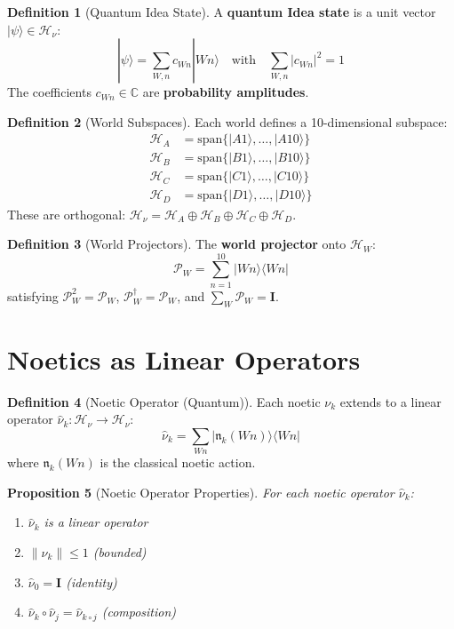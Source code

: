 \documentclass[11pt,twoside,openright]{book}
\theoremstyle{definition}
\newtheorem{definition}{Definition}[chapter]
\theoremstyle{plain}
\newtheorem{proposition}[definition]{Proposition}
\theoremstyle{remark}
\newcommand{\noe}[1]{\nu_{#1}}
\newcommand{\Hspace}{\mathcal{H}}
\newcommand{\qket}[1]{|#1\rangle}
\newcommand{\qbra}[1]{\langle #1|}
\newcommand{\qop}[1]{\hat{#1}}
\newcommand{\Projector}{\mathcal{P}}         %
\begin{document}
\begin{definition}[Quantum Idea State]
\label{def:quantum-idea}
A \textbf{quantum Idea state} is a unit vector $\qket{\psi} \in \Hspace_\nu$:
\[
\qket{\psi} = \sum_{W,n} c_{Wn} \qket{Wn} \quad \text{with} \quad \sum_{W,n} |c_{Wn}|^2 = 1
\]
The coefficients $c_{Wn} \in \mathbb{C}$ are \textbf{probability amplitudes}.
\end{definition}

\begin{definition}[World Subspaces]
\label{def:world-subspaces}
Each world defines a 10-dimensional subspace:
\begin{align}
\Hspace_A &= \mathrm{span}\{\qket{A1}, \ldots, \qket{A10}\} \\
\Hspace_B &= \mathrm{span}\{\qket{B1}, \ldots, \qket{B10}\} \\
\Hspace_C &= \mathrm{span}\{\qket{C1}, \ldots, \qket{C10}\} \\
\Hspace_D &= \mathrm{span}\{\qket{D1}, \ldots, \qket{D10}\}
\end{align}
These are orthogonal: $\Hspace_\nu = \Hspace_A \oplus \Hspace_B \oplus \Hspace_C \oplus \Hspace_D$.
\end{definition}

\begin{definition}[World Projectors]
\label{def:world-projectors}
The \textbf{world projector} onto $\Hspace_W$:
\[
\Projector_W = \sum_{n=1}^{10} \qket{Wn}\qbra{Wn}
\]
satisfying $\Projector_W^2 = \Projector_W$, $\Projector_W^\dagger = \Projector_W$, and $\sum_W \Projector_W = \mathbf{I}$.
\end{definition}

\section{Noetics as Linear Operators}

\begin{definition}[Noetic Operator (Quantum)]
\label{def:noetic-operator-quantum}
Each noetic $\noe{k}$ extends to a linear operator $\qop{\nu}_k : \Hspace_\nu \to \Hspace_\nu$:
\[
\qop{\nu}_k = \sum_{Wn} \qket{\mathfrak{n}_k(Wn)}\qbra{Wn}
\]
where $\mathfrak{n}_k(Wn)$ is the classical noetic action.
\end{definition}

\begin{proposition}[Noetic Operator Properties]
\label{prop:noetic-op-props}
For each noetic operator $\qop{\nu}_k$:
\begin{enumerate}
  \item $\qop{\nu}_k$ is a linear operator
  \item $\|\qop{\nu}_k\| \leq 1$ (bounded)
  \item $\qop{\nu}_0 = \mathbf{I}$ (identity)
  \item $\qop{\nu}_k \circ \qop{\nu}_j = \qop{\nu}_{k \circ j}$ (composition)
\end{enumerate}
\end{proposition}
\end{document}
